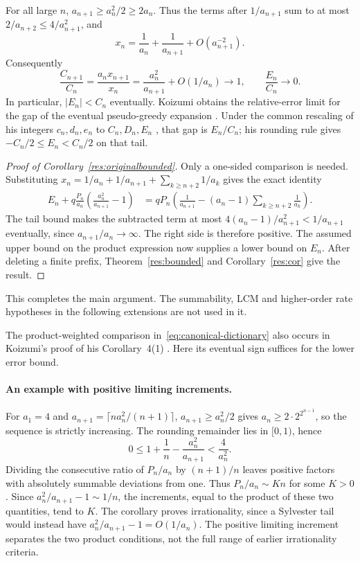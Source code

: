 \documentclass[11pt]{article}
\begin{document}
For all large $n$, $a_{n+1}\ge a_n^2/2\ge2a_n$. Thus the terms after
$1/a_{n+1}$ sum to at most $2/a_{n+2}\le4/a_{n+1}^2$, and
\[
 x_n=\frac1{a_n}+\frac1{a_{n+1}}+O(a_{n+1}^{-2}).
\]
Consequently
\[
 \frac{C_{n+1}}{C_n}
 =\frac{a_nx_{n+1}}{x_n}
 =\frac{a_n^2}{a_{n+1}}+O(1/a_n)\longrightarrow1,
 \qquad \frac{E_n}{C_n}\longrightarrow0.
\]
In particular, $|E_n|<C_n$ eventually. Koizumi obtains the relative-error limit for
the gap of the eventual pseudo-greedy expansion
\cite[Corollary~3, p.~9]{koizumi2025}. Under the common rescaling of
his integers $c_n,d_n,e_n$ to $C_n,D_n,E_n$
\cite[pp.~11--12]{koizumi2025}, that gap is $E_n/C_n$; his rounding
rule gives $-C_n/2\le E_n<C_n/2$ on that tail.

\begin{proof}[Proof of Corollary~\ref{res:originalbounded}]
Only a one-sided comparison is needed. Substituting
$x_n=1/a_n+1/a_{n+1}+\sum_{k\ge n+2}1/a_k$ gives the exact identity
\begin{equation}\label{eq:canonical-dictionary}
 \begin{aligned}
 E_n+q\frac{P_n}{a_n}\left(\frac{a_n^2}{a_{n+1}}-1\right)
 &=qP_n\left(\frac1{a_{n+1}}
 -(a_n-1)\sum_{k\ge n+2}\frac1{a_k}\right).
 \end{aligned}
\end{equation}
The tail bound makes the subtracted term at most
$4(a_n-1)/a_{n+1}^2<1/a_{n+1}$ eventually, since
$a_{n+1}/a_n\to\infty$. The right side is therefore positive.
The assumed upper bound on the product expression now supplies a
lower bound on $E_n$.
After deleting a finite prefix, Theorem~\ref{res:bounded} and
Corollary~\ref{res:cor} give the result.
\end{proof}

This completes the main argument. The summability, LCM and higher-order
rate hypotheses in the following extensions are not used in it.

The product-weighted comparison in~\eqref{eq:canonical-dictionary}
also occurs in Koizumi's proof of his Corollary~4(1)
\cite[(11)--(12), p.~15]{koizumi2025}. Here its eventual sign suffices
for the lower error bound.

\paragraph{An example with positive limiting increments.}
For $a_1=4$ and $a_{n+1}=\lceil n a_n^2/(n+1)\rceil$,
$a_{n+1}\ge a_n^2/2$ gives $a_n\ge2\cdot2^{2^{n-1}}$, so the sequence
is strictly increasing. The rounding remainder lies in $[0,1)$, hence
\[
 0\le1+\frac1n-\frac{a_n^2}{a_{n+1}}<\frac4{a_n^2}.
\]
Dividing the consecutive ratio of $P_n/a_n$ by $(n+1)/n$ leaves
positive factors with absolutely summable deviations from one.
Thus $P_n/a_n\sim Kn$ for some $K>0$. Since
$a_n^2/a_{n+1}-1\sim1/n$, the increments, equal to the product of
these two quantities, tend to $K$.
The corollary proves irrationality, since a Sylvester tail would instead
have $a_n^2/a_{n+1}-1=O(1/a_n)$. The positive limiting increment separates
the two product conditions, not the full range of earlier irrationality
criteria.
\end{document}

